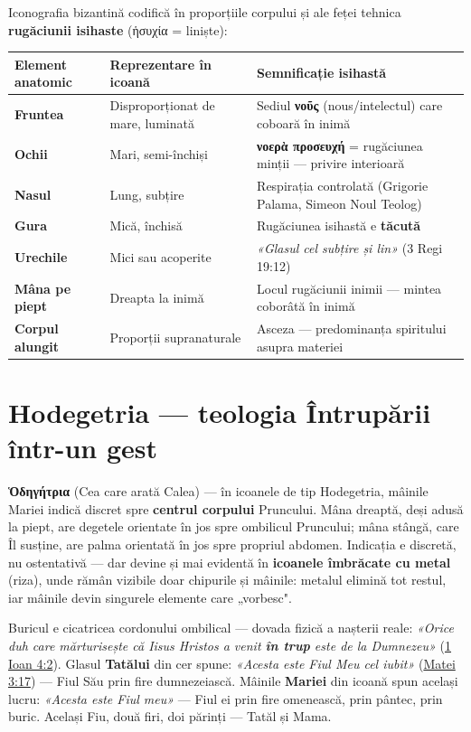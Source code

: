 \documentclass[12pt,a4paper,twoside,openany]{book}
\begin{document}
Iconografia bizantină codifică în proporțiile corpului și ale feței tehnica \textbf{rugăciunii isihaste} (ἡσυχία = liniște):

\begin{center}
\footnotesize
\begin{tabular}{L{2.5cm}L{3.5cm}L{6.5cm}}
\toprule
{}
\textbf{Element anatomic} & \textbf{Reprezentare în icoană} & \textbf{Semnificație isihastă} \\
\midrule
\textbf{Fruntea} & Disproporționat de mare, luminată & Sediul \textbf{νοῦς} (nous/intelectul) care coboară în inimă \\
\textbf{Ochii} & Mari, semi-închiși & \textbf{νοερὰ προσευχή} = rugăciunea minții --- privire interioară \\
\textbf{Nasul} & Lung, subțire & Respirația controlată (Grigorie Palama, Simeon Noul Teolog) \\
\textbf{Gura} & Mică, închisă & Rugăciunea isihastă e \textbf{tăcută} \\
\textbf{Urechile} & Mici sau acoperite & \textit{«Glasul cel subțire și lin»} (3 Regi 19:12) \\
\textbf{Mâna pe piept} & Dreapta la inimă & Locul rugăciunii inimii --- mintea coborâtă în inimă \\
\textbf{Corpul alungit} & Proporții supranaturale & Asceza --- predominanța spiritului asupra materiei \\
\bottomrule
\end{tabular}
\end{center}

\section*{Hodegetria --- teologia Întrupării într-un gest}

\textbf{Ὁδηγήτρια} (Cea care arată Calea) --- în icoanele de tip Hodegetria, mâinile Mariei indică discret spre \textbf{centrul corpului} Pruncului. Mâna dreaptă, deși adusă la piept, are degetele orientate în jos spre ombilicul Pruncului; mâna stângă, care Îl susține, are palma orientată în jos spre propriul abdomen. Indicația e discretă, nu ostentativă --- dar devine și mai evidentă în \textbf{icoanele îmbrăcate cu metal} (riza), unde rămân vizibile doar chipurile și mâinile: metalul elimină tot restul, iar mâinile devin singurele elemente care „vorbesc".

Buricul e cicatricea cordonului ombilical --- dovada fizică a nașterii reale: \textit{«Orice duh care mărturisește că Iisus Hristos a venit \textbf{în trup} este de la Dumnezeu»} (\href{https://bibliaortodoxa.ro/carte.php?id=36\&cap=4\#2}{1 Ioan 4:2}). Glasul \textbf{Tatălui} din cer spune: \textit{«Acesta este Fiul Meu cel iubit»} (\href{https://bibliaortodoxa.ro/carte.php?id=55\&cap=3\#17}{Matei 3:17}) --- Fiul Său prin fire dumnezeiască. Mâinile \textbf{Mariei} din icoană spun același lucru: \textit{«Acesta este Fiul meu»} --- Fiul ei prin fire omenească, prin pântec, prin buric. Același Fiu, două firi, doi părinți --- Tatăl și Mama.
\end{document}
